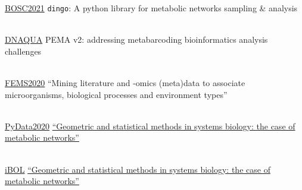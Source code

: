 \documentclass[
	a4paper,
]{fortysecondscv}
\begin{document}

\begin{cvtable}

    	{\href{https://www.open-bio.org/events/bosc-2021/}{BOSC2021}}
	    {\texttt{dingo}: A python library for metabolic networks sampling \& analysis}{}

    \\
    
    	{\href{https://symposium.inrae.fr/dnaqua-conference-evian2021/}{DNAQUA}}
	    {PEMA v2: addressing metabarcoding bioinformatics analysis challenges}{}
	    
	\\

    	{\href{https://fems2020belgrade.com/}{FEMS2020}}
	    {“Mining literature and -omics (meta)data to associate microorganisms, biological processes and environment types”}{}

    \\

    	{\href{https://pydata.org/global2020/}{PyData2020}}
	    {\href{https://www.youtube.com/watch?v=zg8KFZ_LbHM&t=1s}{“Geometric and statistical methods in systems biology: the case of metabolic networks”}}{}

    \\
    
    	{\href{http://dnabarcodes2019.org/}{iBOL}}
    	{\href{Geometric and statistical methods in systems biology the case of metabolic net}{“Geometric and statistical methods in systems biology: the case of metabolic networks”}}{}

\end{cvtable}
\end{document}
